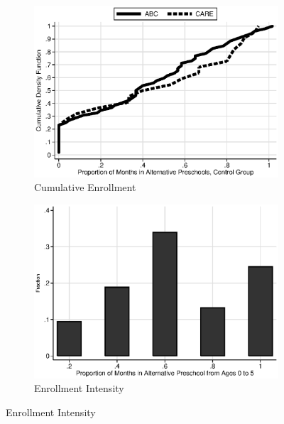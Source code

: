 \begin{figure}
\begin{subfigure}[h]{0.4\textwidth}
\end{subfigure}\\
\begin{subfigure}[h]{0.4\textwidth}
		\centering
		\caption{Cumulative Enrollment} \label{fig:treatsubcare}
		\includegraphics[width=\textwidth]{output/abccare_controlcontamination.eps}
\end{subfigure}
\begin{subfigure}[h]{0.4\textwidth}
	\centering
	\caption{Enrollment Intensity} \label{fig:proportion-alt-pre}
		\includegraphics[width=\textwidth]{output/abccare_Vfractimes.eps}
\end{subfigure}%


\end{figure}
